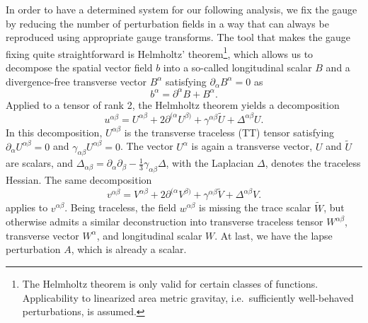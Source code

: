 In order to have a determined system for our following analysis, we fix the gauge by reducing the number of perturbation fields in a way that can always be reproduced using appropriate gauge transforms. The tool that makes the gauge fixing quite straightforward is Helmholtz' theorem\footnote{The Helmholtz theorem is only valid for certain classes of functions. Applicability to linearized area metric gravitay, i.e.~sufficiently well-behaved perturbations, is assumed.}, which allows us to decompose the spatial vector field $b$ into a so-called longitudinal scalar $B$ and a divergence-free transverse vector $B^\alpha$ satisfying $\partial_\alpha B^\alpha = 0$ as
\begin{equation}
  b^\alpha = \partial^\alpha B + B^\alpha.
\end{equation}
Applied to a tensor of rank 2, the Helmholtz theorem yields a decomposition
\begin{equation}
  u^{\alpha\beta} = U^{\alpha\beta} + 2\partial^{(\alpha}U^{\beta)} + \gamma^{\alpha\beta} \tilde U + \Delta^{\alpha\beta} U.
\end{equation}
In this decomposition, $U^{\alpha\beta}$ is the transverse traceless (TT) tensor satisfying $\partial_\alpha U^{\alpha\beta} = 0$ and $\gamma_{\alpha\beta}U^{\alpha\beta}=0$. The vector $U^\alpha$ is again a transverse vector, $U$ and $\tilde U$ are scalars, and $\Delta_{\alpha\beta} = \partial_\alpha\partial_\beta - \frac{1}{3}\gamma_{\alpha\beta}\Delta$, with the Laplacian $\Delta$, denotes the traceless Hessian. The same decomposition
\begin{equation}
  v^{\alpha\beta} = V^{\alpha\beta} + 2\partial^{(\alpha}V^{\beta)} + \gamma^{\alpha\beta} \tilde V + \Delta^{\alpha\beta} V.
\end{equation}
applies to $v^{\alpha\beta}$. Being traceless, the field $w^{\alpha\beta}$ is missing the trace scalar $\tilde W$, but otherwise admits a similar deconstruction into transverse traceless tensor $W^{\alpha\beta}$, transverse vector $W^\alpha$, and longitudinal scalar $W$. At last, we have the lapse perturbation $A$, which is already a scalar.

